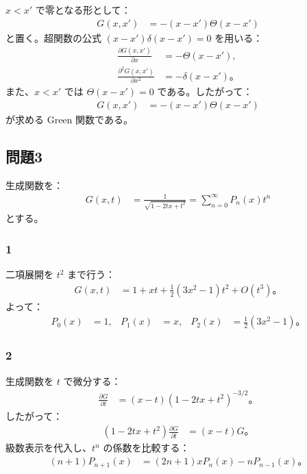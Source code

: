 \documentclass[platex,dvipdfmx,a4paper]{jsarticle}
\newcommand{\hb}[2]{\frac{\partial #1}{\partial #2}}
\newcommand{\nhb}[3]{\frac{\partial^{#1} #2}{\partial #3^{#1}}}
\begin{document}
$x<x'$ で零となる形として：
\begin{align*}
  G(x,x')
  &=-(x-x')\Theta(x-x')
\end{align*}
と置く。超関数の公式 $(x-x')\delta(x-x')=0$ を用いる：
\begin{align*}
  \hb{G(x,x')}{x}
  &=-\Theta(x-x'),\\
  \nhb{2}{G(x,x')}{x}
  &=-\delta(x-x')。
\end{align*}
また、$x<x'$ では $\Theta(x-x')=0$ である。したがって：
\begin{align*}
  G(x,x')
  &=-(x-x')\Theta(x-x')
\end{align*}
が求める Green 関数である。

\subsection*{問題3}

生成関数を：
\begin{align*}
  G(x,t)
  &=\frac{1}{\sqrt{1-2tx+t^2}}
   =\sum_{n=0}^{\infty}P_n(x)t^n
\end{align*}
とする。

\subsubsection*{1}

二項展開を $t^2$ まで行う：
\begin{align*}
  G(x,t)
  &=1+xt+\frac{1}{2}(3x^2-1)t^2+O(t^3)。
\end{align*}
よって：
\begin{align*}
  P_0(x)&=1,
  &P_1(x)&=x,
  &P_2(x)&=\frac{1}{2}(3x^2-1)。
\end{align*}

\subsubsection*{2}

生成関数を $t$ で微分する：
\begin{align*}
  \hb{G}{t}
  &=(x-t)(1-2tx+t^2)^{-3/2}。
\end{align*}
したがって：
\begin{align*}
  (1-2tx+t^2)\hb{G}{t}
  &=(x-t)G。
\end{align*}
級数表示を代入し、$t^n$ の係数を比較する：
\begin{align*}
  (n+1)P_{n+1}(x)
  &=(2n+1)xP_n(x)-nP_{n-1}(x)。
\end{align*}
\end{document}

